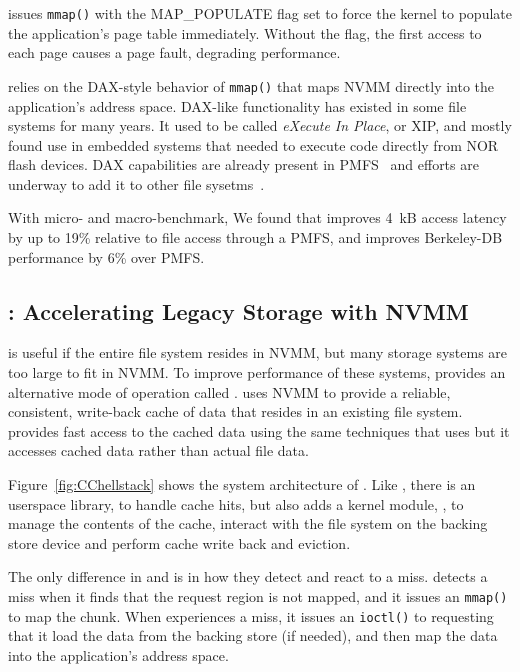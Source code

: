 {\DAChell{} issues \texttt{mmap()} with the MAP\_POPULATE flag set to force the kernel to
populate the application's page table immediately.  Without the flag, the first
access to each page causes a page fault, degrading performance.

\DAChell{} relies on the DAX-style behavior of \texttt{mmap()} that maps NVMM
directly into the application's address space.  DAX-like functionality has
existed in some file systems for many years.  It used to be called
\emph{eXecute In Place}, or XIP, and mostly found use in embedded systems that
needed to execute
code directly from NOR flash devices.  DAX capabilities are already present in
PMFS~\cite{PMFS} and efforts are underway to add it to other file sysetms~\cite{ext4dax}.

With micro- and macro-benchmark, We found that \DAChell{} improves 4~kB access
latency by up to 19\% relative to file access through a PMFS, and improves
Berkeley-DB performance by 6\% over PMFS.
}

\subsection{\CChell{}: Accelerating Legacy Storage with NVMM}
\label{sec:overview}

\DAChell{} is useful if the entire file system resides in NVMM, but many
storage systems are too large to fit in NVMM.  To improve
performance of these systems, \Chell{} provides an alternative mode of
operation called \CChell{}.  \CChell{} uses NVMM to provide a reliable,
consistent, write-back cache of data that resides in an existing file system.
\CChell{} provides fast access to the cached data using the same techniques
that \DAChell{} uses but it accesses cached data rather than actual file data.

Figure~\ref{fig:CChellstack} shows the system architecture of \CChell{}.
Like \DAChell{}, there is an userspace library, \lib{} to handle cache
hits, but \CChell{} also adds a kernel module, \drv{}, to
manage the contents of the cache, interact with the file system on the
backing store device and perform cache write back and eviction.

The only difference in \libd{} and \lib{} is in
how they detect and react to a miss.  \Libd{} detects a miss when it
finds that the request region is not mapped, and it 
issues an \texttt{mmap()} to map the chunk. When
\Lib{} experiences a miss,
it issues an \texttt{ioctl()} to \drv{} requesting that
it load the data from the backing store (if needed), and then map the data into
the application's address space.

